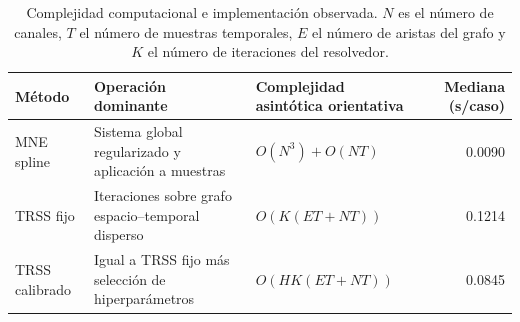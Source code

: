 \begin{table}[htbp]
\centering
\small
\caption{Complejidad computacional e implementación observada. $N$ es el número de canales, $T$ el número de muestras temporales, $E$ el número de aristas del grafo y $K$ el número de iteraciones del resolvedor.}
\label{tab:ch6_runtime_complexity}
\begin{tabular}{@{}p{2.6cm}p{3.9cm}p{3.2cm}r@{}}
\toprule
Método & Operación dominante & Complejidad asintótica orientativa & Mediana (s/caso) \\
\midrule
MNE spline & Sistema global regularizado y aplicación a muestras & $O(N^3) + O(NT)$ & 0.0090 \\
TRSS fijo & Iteraciones sobre grafo espacio--temporal disperso & $O(K(ET + NT))$ & 0.1214 \\
TRSS calibrado & Igual a TRSS fijo más selección de hiperparámetros & $O(HK(ET + NT))$ & 0.0845 \\
\bottomrule
\end{tabular}
\end{table}
